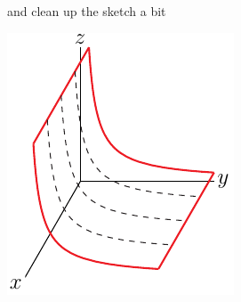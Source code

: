 \begin{eg}[$yz=1$]
\begin{efig}
\begin{center}
\end{center}
\end{efig}
and clean up the sketch a bit
\begin{efig}
\begin{center}
   \includegraphics{hyperbolicCylinderC.pdf}
\end{center}
\end{efig}
\end{eg}


